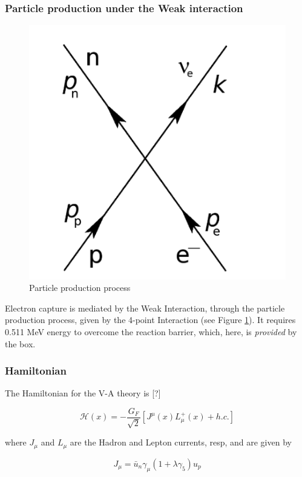 \documentclass[11pt]{amsart}
\begin{document}
\subsubsection{Particle production under the Weak interaction}

\begin{figure}
   \includegraphics[scale=0.25]{img/feynman.png}
   \caption{Particle production process}
  \label{fig:ppp}
\end{figure}

Electron capture is mediated by the Weak Interaction, through the particle production process, given by the 4-point Interaction (see Figure \ref{fig:ppp}).   It requires 0.511 MeV energy to overcome the reaction barrier, which, here, is \emph{provided} by the box. 

\subsubsection{Hamiltonian}

The Hamiltonian for the V-A theory is [?]

$$\mathcal{H}(x)=-\dfrac{G_{F}}{\sqrt{2}}\left[J^{\mu}(x)L^{+}_{\mu}(x)+h.c.\right]$$

where $J_{\mu}$ and $L_{\mu}$ are the Hadron and Lepton currents, resp, and are given by

$$J_{\mu}=\bar{u}_{n}\gamma_{\mu}(1+\lambda\gamma_{5})u_{p}$$
\end{document}
